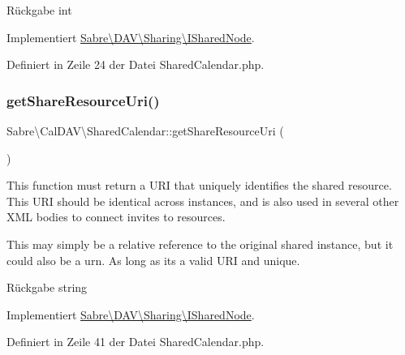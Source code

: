 \begin{DoxyReturn}{Rückgabe}
int 
\end{DoxyReturn}


Implementiert \mbox{\hyperlink{interface_sabre_1_1_d_a_v_1_1_sharing_1_1_i_shared_node_a1c9b44f6acd1cd63b211bdf987b9d098}{Sabre\textbackslash{}\+D\+A\+V\textbackslash{}\+Sharing\textbackslash{}\+I\+Shared\+Node}}.



Definiert in Zeile 24 der Datei Shared\+Calendar.\+php.

\mbox{\label{class_sabre_1_1_cal_d_a_v_1_1_shared_calendar_a0c3380bdb7a9c6e9f7c347477e7d0dd9}} 
\subsubsection{\texorpdfstring{get\+Share\+Resource\+Uri()}{getShareResourceUri()}}
{\footnotesize\ttfamily Sabre\textbackslash{}\+Cal\+D\+A\+V\textbackslash{}\+Shared\+Calendar\+::get\+Share\+Resource\+Uri (\begin{DoxyParamCaption}{ }\end{DoxyParamCaption})}

This function must return a U\+RI that uniquely identifies the shared resource. This U\+RI should be identical across instances, and is also used in several other X\+ML bodies to connect invites to resources.

This may simply be a relative reference to the original shared instance, but it could also be a urn. As long as it\textquotesingle{}s a valid U\+RI and unique.

\begin{DoxyReturn}{Rückgabe}
string 
\end{DoxyReturn}


Implementiert \mbox{\hyperlink{interface_sabre_1_1_d_a_v_1_1_sharing_1_1_i_shared_node_a54b1073bfc389995c722566e18426902}{Sabre\textbackslash{}\+D\+A\+V\textbackslash{}\+Sharing\textbackslash{}\+I\+Shared\+Node}}.



Definiert in Zeile 41 der Datei Shared\+Calendar.\+php.

